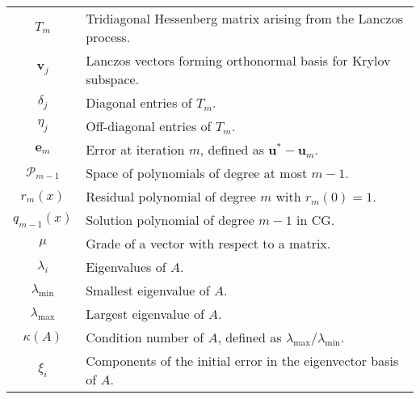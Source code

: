 \begin{longtable}{c p{10cm}}
    $T_m$                            & Tridiagonal Hessenberg matrix arising from the Lanczos process.                                             \\
    $\mathbf{v}_j$                   & Lanczos vectors forming orthonormal basis for Krylov subspace.                                              \\
    $\delta_j$                       & Diagonal entries of $T_m$.                                                                                  \\
    $\eta_j$                         & Off-diagonal entries of $T_m$.                                                                              \\
    $\mathbf{e}_m$                   & Error at iteration $m$, defined as $\mathbf{u}^* - \mathbf{u}_m$.                                           \\
    $\mathcal{P}_{m-1}$              & Space of polynomials of degree at most $m-1$.                                                               \\
    $r_m(x)$                         & Residual polynomial of degree $m$ with $r_m(0) = 1$.                                                        \\
    $q_{m-1}(x)$                     & Solution polynomial of degree $m-1$ in CG.                                                                  \\
    $\mu$                            & Grade of a vector with respect to a matrix.                                                                 \\
    $\lambda_i$                      & Eigenvalues of $A$.                                                                                         \\
    $\lambda_{\min}$                 & Smallest eigenvalue of $A$.                                                                                 \\
    $\lambda_{\max}$                 & Largest eigenvalue of $A$.                                                                                  \\
    $\kappa(A)$                      & Condition number of $A$, defined as $\lambda_{\max}/\lambda_{\min}$.                                        \\
    $\xi_i$                          & Components of the initial error in the eigenvector basis of $A$.                                            \\

\end{longtable}
